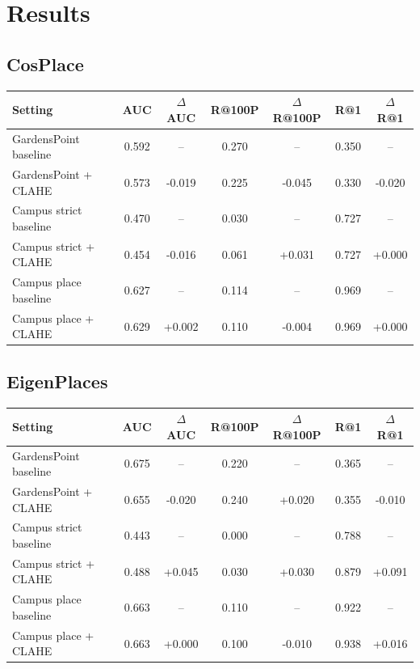 \documentclass[11pt]{article}
\begin{document}
\section*{Results}
\subsection*{CosPlace}
\begin{center}
\begin{tabular}{>{\raggedright\arraybackslash}p{3.0cm}cccccc}
\toprule
\textbf{Setting} & \textbf{AUC} & \textbf{$\Delta$AUC} & \textbf{R@100P} & \textbf{$\Delta$R@100P} & \textbf{R@1} & \textbf{$\Delta$R@1} \\
\midrule
GardensPoint baseline & 0.592 & -- & 0.270 & -- & 0.350 & -- \\
GardensPoint + CLAHE & 0.573 & -0.019 & 0.225 & -0.045 & 0.330 & -0.020 \\
\midrule
Campus strict baseline & 0.470 & -- & 0.030 & -- & 0.727 & -- \\
Campus strict + CLAHE & 0.454 & -0.016 & 0.061 & +0.031 & 0.727 & +0.000 \\
\midrule
Campus place baseline & 0.627 & -- & 0.114 & -- & 0.969 & -- \\
Campus place + CLAHE & 0.629 & +0.002 & 0.110 & -0.004 & 0.969 & +0.000 \\
\bottomrule
\end{tabular}
\end{center}

\subsection*{EigenPlaces}
\begin{center}
\begin{tabular}{>{\raggedright\arraybackslash}p{3.0cm}cccccc}
\toprule
\textbf{Setting} & \textbf{AUC} & \textbf{$\Delta$AUC} & \textbf{R@100P} & \textbf{$\Delta$R@100P} & \textbf{R@1} & \textbf{$\Delta$R@1} \\
\midrule
GardensPoint baseline & 0.675 & -- & 0.220 & -- & 0.365 & -- \\
GardensPoint + CLAHE & 0.655 & -0.020 & 0.240 & +0.020 & 0.355 & -0.010 \\
\midrule
Campus strict baseline & 0.443 & -- & 0.000 & -- & 0.788 & -- \\
Campus strict + CLAHE & 0.488 & +0.045 & 0.030 & +0.030 & 0.879 & +0.091 \\
\midrule
Campus place baseline & 0.663 & -- & 0.110 & -- & 0.922 & -- \\
Campus place + CLAHE & 0.663 & +0.000 & 0.100 & -0.010 & 0.938 & +0.016 \\
\bottomrule
\end{tabular}
\end{center}
\end{document}
